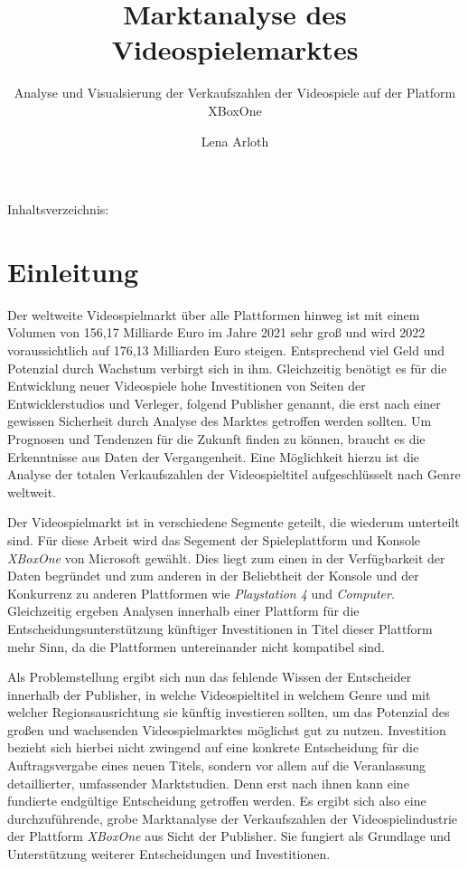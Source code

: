 \documentclass[usegeometry=true]{scrartcl}
\begin{document}
\subject{Projektbericht zum Modul Information Retrieval und Visualisierung Sommersemester 2022}
\title{Marktanalyse des Videospielemarktes}
\subtitle{Analyse und Visualsierung der Verkaufszahlen der Videospiele auf der Platform XBoxOne}
\author{Lena Arloth}%
\maketitle%
Inhaltsverzeichnis:
\tableofcontents

\section{Einleitung}
Der weltweite Videospielmarkt über alle Plattformen hinweg ist mit einem Volumen von 156,17 Milliarde Euro im Jahre 2021 sehr groß und wird 2022 voraussichtlich auf 176,13 Milliarden Euro steigen.\cite{Statista.2022b}
Entsprechend viel Geld und Potenzial durch Wachstum verbirgt sich in ihm.
Gleichzeitig benötigt es für die Entwicklung neuer Videospiele hohe Investitionen von Seiten der Entwicklerstudios und Verleger, folgend Publisher genannt, die erst nach einer gewissen Sicherheit durch Analyse des Marktes getroffen werden sollten.
Um Prognosen und Tendenzen für die Zukunft finden zu können, braucht es die Erkenntnisse aus Daten der Vergangenheit.
Eine Möglichkeit hierzu ist die Analyse der totalen Verkaufszahlen der Videospieltitel aufgeschlüsselt nach Genre weltweit.

Der Videospielmarkt ist in verschiedene Segmente geteilt, die wiederum unterteilt sind. Für diese Arbeit wird das Segement der Spieleplattform und Konsole \textit{XBoxOne} von Microsoft gewählt.
Dies liegt zum einen in der Verfügbarkeit der Daten begründet und zum anderen in der Beliebtheit der Konsole und der Konkurrenz zu anderen Plattformen wie \textit{Playstation 4} und \textit{Computer}.
Gleichzeitig ergeben Analysen innerhalb einer Plattform für die Entscheidungsunterstützung künftiger Investitionen in Titel dieser Plattform mehr Sinn, da die Plattformen untereinander nicht kompatibel sind.

Als Problemstellung ergibt sich nun das fehlende Wissen der Entscheider innerhalb der Publisher, in welche Videospieltitel in welchem Genre und mit welcher Regionsausrichtung sie künftig investieren sollten, um das Potenzial des großen und wachsenden Videospielmarktes möglichst gut zu nutzen.
Investition bezieht sich hierbei nicht zwingend auf eine konkrete Entscheidung für die Auftragsvergabe eines neuen Titels, sondern vor allem auf die Veranlassung detaillierter, umfassender Marktstudien.
Denn erst nach ihnen kann eine fundierte endgültige Entscheidung getroffen werden.
Es ergibt sich also eine durchzuführende, grobe Marktanalyse der Verkaufszahlen der Videospielindustrie der Plattform \textit{XBoxOne} aus Sicht der Publisher.
Sie fungiert als Grundlage und Unterstützung weiterer Entscheidungen und Investitionen.
\end{document}
